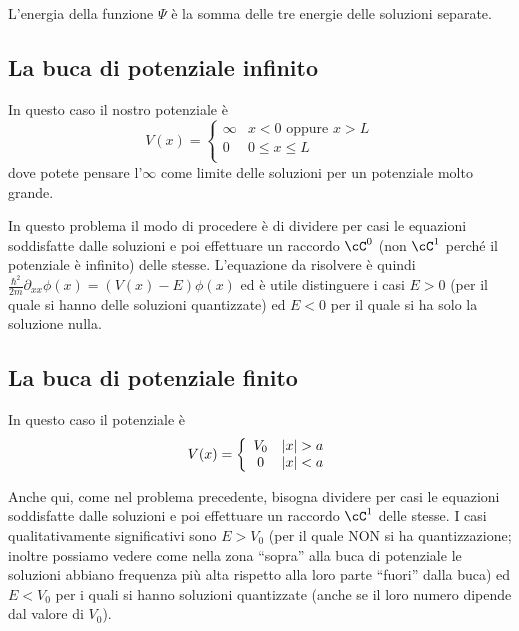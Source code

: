 \documentclass[10pt,a4paper]{article}
\begin{document}
\begin{multicols}{2}
  L'energia della funzione $\Psi$ è la somma delle tre energie delle soluzioni separate.
  
  \subsection*{La buca di potenziale infinito}
  In questo caso il nostro potenziale è
  \begin{displaymath}
    V(x) = \left\{
      \begin{array}{cr}
        \infty & x < 0 \text{ oppure } x > L \\
        0 & 0 \le x \le L \\
      \end{array}
    \right.
  \end{displaymath}
  dove potete pensare l'$\infty$ come limite delle soluzioni per un potenziale molto grande.

  In questo problema il modo di procedere è di dividere per casi le equazioni soddisfatte dalle soluzioni e poi effettuare un raccordo $\cC^0$ (non $\cC^1$ perché il potenziale è infinito) delle stesse. L'equazione da risolvere è quindi $\frac{\hbar^2}{2m} \partial_{xx} \phi(x) = (V(x) - E) \phi(x)$ ed è utile distinguere i casi $E > 0$ (per il quale si hanno delle soluzioni quantizzate) ed $E < 0$ per il quale si ha solo la soluzione nulla.
  
  \subsection*{La buca di potenziale finito}
  In questo caso il potenziale è
  \begin{displaymath}
    V(x) = \left\{
      \begin{array}{cr}
        V_0 & \left|{x}\right| > a \\
        0 & \left|{x}\right| < a \\
      \end{array}
    \right.
  \end{displaymath}

  Anche qui, come nel problema precedente, bisogna dividere per casi le equazioni soddisfatte dalle soluzioni e poi effettuare un raccordo $\cC^1$ delle stesse. I casi qualitativamente significativi sono $E > V_0$ (per il quale NON si ha quantizzazione; inoltre possiamo vedere come nella zona ``sopra'' alla buca di potenziale le soluzioni abbiano frequenza più alta rispetto alla loro parte ``fuori'' dalla buca) ed $E < V_0$ per i quali si hanno soluzioni quantizzate (anche se il loro numero dipende dal valore di $V_0$).
  

\end{multicols}
\end{document}
